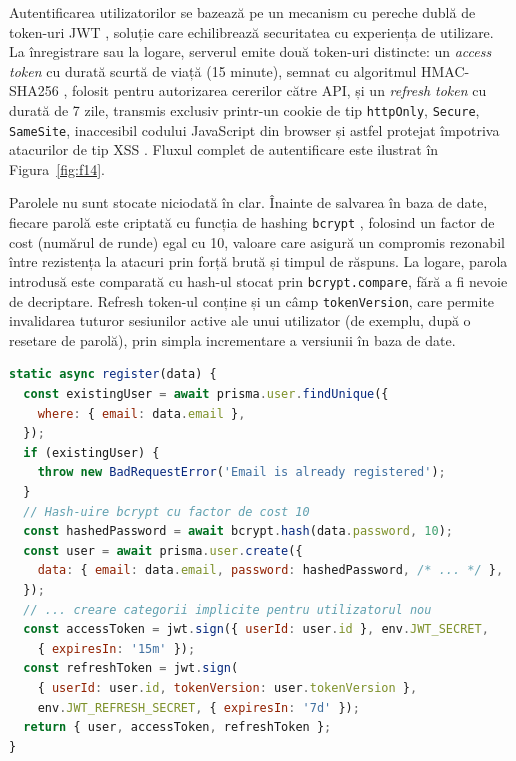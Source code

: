\documentclass[12pt,a4paper,oneside]{report}
\begin{document}
Autentificarea utilizatorilor se bazează pe un mecanism cu pereche dublă de token-uri JWT \cite{ref:jwt}, soluție care echilibrează securitatea cu experiența de utilizare. La înregistrare sau la logare, serverul emite două token-uri distincte: un \emph{access token} cu durată scurtă de viață (15 minute), semnat cu algoritmul HMAC-SHA256 \cite{ref:hmac}, folosit pentru autorizarea cererilor către API, și un \emph{refresh token} cu durată de 7 zile, transmis exclusiv printr-un cookie de tip \texttt{httpOnly}, \texttt{Secure}, \texttt{SameSite}, inaccesibil codului JavaScript din browser și astfel protejat împotriva atacurilor de tip XSS \cite{ref:owasp}. Fluxul complet de autentificare este ilustrat în Figura~\ref{fig:f14}.

Parolele nu sunt stocate niciodată în clar. Înainte de salvarea în baza de date, fiecare parolă este criptată cu funcția de hashing \texttt{bcrypt} \cite{ref:bcrypt}, folosind un factor de cost (numărul de runde) egal cu 10, valoare care asigură un compromis rezonabil între rezistența la atacuri prin forță brută și timpul de răspuns. La logare, parola introdusă este comparată cu hash-ul stocat prin \texttt{bcrypt.compare}, fără a fi nevoie de decriptare. Refresh token-ul conține și un câmp \texttt{tokenVersion}, care permite invalidarea tuturor sesiunilor active ale unui utilizator (de exemplu, după o resetare de parolă), prin simpla incrementare a versiunii în baza de date.

\noindent\begin{minipage}{\textwidth}
\begin{lstlisting}[language=JavaScript,caption={Înregistrarea utilizatorului și emiterea perechii de token-uri JWT}]
static async register(data) {
  const existingUser = await prisma.user.findUnique({
    where: { email: data.email },
  });
  if (existingUser) {
    throw new BadRequestError('Email is already registered');
  }
  // Hash-uire bcrypt cu factor de cost 10
  const hashedPassword = await bcrypt.hash(data.password, 10);
  const user = await prisma.user.create({
    data: { email: data.email, password: hashedPassword, /* ... */ },
  });
  // ... creare categorii implicite pentru utilizatorul nou
  const accessToken = jwt.sign({ userId: user.id }, env.JWT_SECRET,
    { expiresIn: '15m' });
  const refreshToken = jwt.sign(
    { userId: user.id, tokenVersion: user.tokenVersion },
    env.JWT_REFRESH_SECRET, { expiresIn: '7d' });
  return { user, accessToken, refreshToken };
}
\end{lstlisting}
\end{minipage}
\medskip
\end{document}
